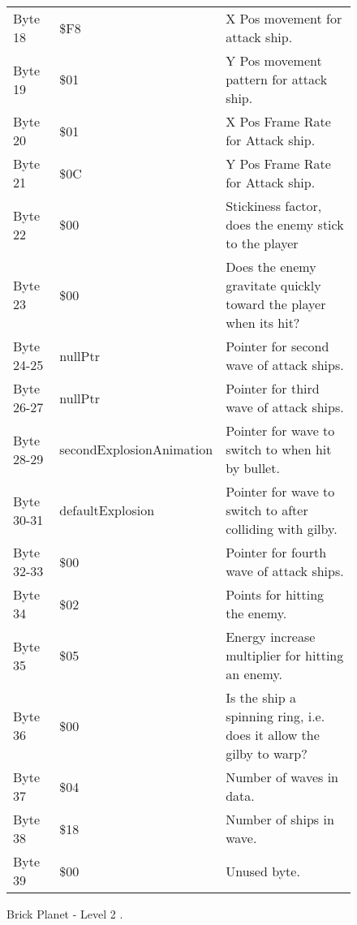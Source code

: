 \begin{figure}[H]
{\begin{adjustbox}{width=12cm}
\begin{tabular}{lll}
 Byte 18    & \$F8                       & X Pos movement for attack ship.                                     \\
 Byte 19    & \$01                       & Y Pos movement pattern for attack ship.                             \\
 Byte 20    & \$01                       & X Pos Frame Rate for Attack ship.                                   \\
 Byte 21    & \$0C                       & Y Pos Frame Rate for Attack ship.                                   \\
 Byte 22    & \$00                       & Stickiness factor, does the enemy stick to the player               \\
 Byte 23    & \$00                       & Does the enemy gravitate quickly toward the player when its hit?    \\
 Byte 24-25 & nullPtr                   & Pointer for second wave of attack ships.                            \\
 Byte 26-27 & nullPtr                   & Pointer for third wave of attack ships.                             \\
 Byte 28-29 & secondExplosionAnimation  & Pointer for wave to switch to when hit by bullet.                   \\
 Byte 30-31 & defaultExplosion          & Pointer for  wave to switch to after colliding with gilby.          \\
 Byte 32-33 & \$00                       & Pointer for fourth wave of attack ships.                            \\
 Byte 34    & \$02                       & Points for hitting the enemy.                                       \\
 Byte 35    & \$05                       & Energy increase multiplier for hitting an enemy.                    \\
 Byte 36    & \$00                       & Is the ship a spinning ring, i.e. does it allow the gilby to warp?  \\
 Byte 37    & \$04                       & Number of waves in data.                                            \\
 Byte 38    & \$18                       & Number of ships in wave.                                            \\
 Byte 39    & \$00                       & Unused byte.                                                        \\
\bottomrule
\end{tabular}

  \end{adjustbox}

  }\caption*{Brick Planet - Level 2
.}
\end{figure}

